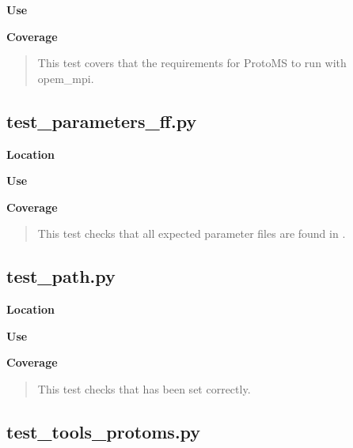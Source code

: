 \documentclass[letterpaper,10pt,english]{manual}
\begin{document}
\textbf{Use}
\begin{quote}

\end{quote}

\textbf{Coverage}
\begin{quote}

This test covers that the requirements for ProtoMS to run with opem\_mpi.
\end{quote}


\subsection{test\_parameters\_ff.py}

\textbf{Location}
\begin{quote}

\end{quote}

\textbf{Use}
\begin{quote}

\end{quote}

\textbf{Coverage}
\begin{quote}

This test checks that all expected parameter files are found in .
\end{quote}


\subsection{test\_path.py}

\textbf{Location}
\begin{quote}

\end{quote}

\textbf{Use}
\begin{quote}

\end{quote}

\textbf{Coverage}
\begin{quote}

This test checks that  has been set correctly.
\end{quote}


\subsection{test\_tools\_protoms.py}
\end{document}
